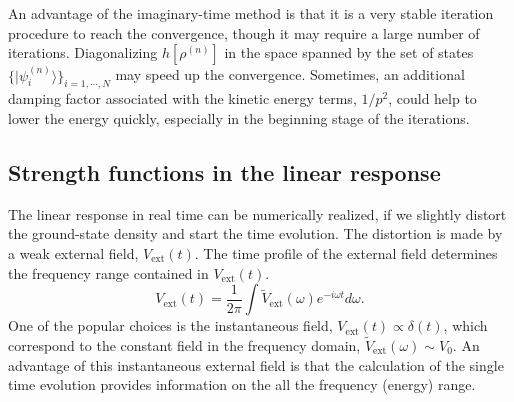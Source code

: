 \documentclass[twoside]{article}
\newcommand{\ket}[1]{| {#1} \rangle}
\begin{document}
{An advantage of the imaginary-time method is that
it is a very stable iteration procedure to reach the convergence,
though it may require a large number of iterations.
Diagonalizing $h[\rho^{(n)}]$ in the space spanned by the set of states
$\{ \ket{\psi_i^{(n)}} \}_{i=1,\cdots, N}$ may speed up the convergence.
Sometimes, an additional damping factor associated with the kinetic
energy terms, $1/p^2$, could help to lower the energy quickly,
especially in the beginning stage of the iterations.

\subsection{Strength functions in the linear response}

The linear response in real time can be numerically realized, if we
slightly distort the ground-state density and start the time evolution.
The distortion is made by a weak external field, $V_\textrm{ext}(t)$.
The time profile of the external field determines the frequency range
contained in $V_\textrm{ext}(t)$.
\begin{equation}
V_\textrm{ext}(t)=\frac{1}{2\pi}\int \tilde{V}_\textrm{ext}(\omega)
 e^{-i\omega t} d\omega .
\end{equation}
One of the popular choices is the instantaneous field,
$V_\textrm{ext}(t)\propto \delta(t)$,
which correspond to the constant field in the frequency domain,
$\tilde{V}_\textrm{ext}(\omega)\sim V_0$.
An advantage of this instantaneous external field is that the
calculation of the single time evolution 
provides information on the all the frequency (energy) range.

}
\end{document}
